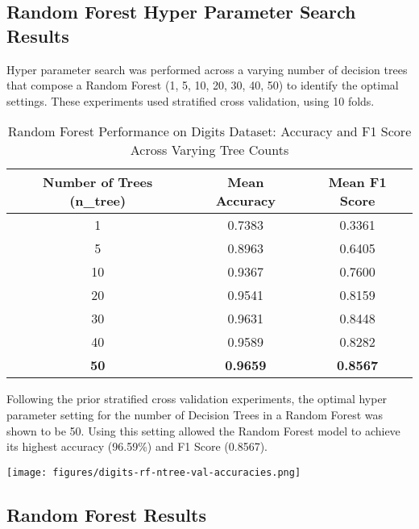 \documentclass[letterpaper]{article}
\begin{document}
\subsection{Random Forest Hyper Parameter Search Results}

 Hyper parameter search was performed across a varying number of decision trees that compose a Random Forest (1, 5, 10, 20, 30, 40, 50) to identify the optimal settings. These experiments used stratified cross validation, using 10 folds.

 \begin{table}[h]
\centering
\begin{tabular}{|c|c|c|}
\hline
\textbf{Number of Trees (n\_tree)} & \textbf{Mean Accuracy} & \textbf{Mean F1 Score} \\
\hline
1  & 0.7383 & 0.3361 \\
5  & 0.8963 & 0.6405 \\
10 & 0.9367 & 0.7600 \\
20 & 0.9541 & 0.8159 \\
30 & 0.9631 & 0.8448 \\
40 & 0.9589 & 0.8282 \\
\textbf{50} & \textbf{0.9659} & \textbf{0.8567} \\
\hline
\end{tabular}
\caption{Random Forest Performance on Digits Dataset: Accuracy and F1 Score Across Varying Tree Counts}
\label{tab:rf_ntree_results}
\end{table}

Following the prior stratified cross validation experiments, the optimal hyper parameter setting for the
number of Decision Trees in a Random Forest was shown to be 50. Using this setting allowed the Random Forest model to achieve its highest accuracy (96.59\%) and F1 Score (0.8567).

\vspace{0.2in}
    \begin{minipage}{\linewidth}
        \centering
        \texttt{[image: figures/digits-rf-ntree-val-accuracies.png]}
    \end{minipage}
\vspace{0.1in}

\subsection*{Random Forest Results}
\end{document}
